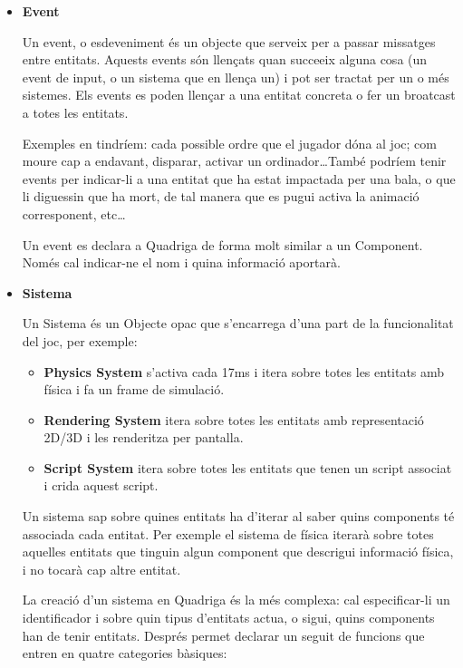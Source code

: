 \begin{itemize}
    \item{\bf Event}

      Un event, o esdeveniment és un objecte que serveix per a passar missatges entre entitats. Aquests events són llençats quan succeeix alguna cosa (un event de input, o un sistema que en llença un) i pot ser tractat per un o més sistemes. Els events es poden llençar a una entitat concreta o fer un broatcast a totes les entitats.
      
      Exemples en tindríem: cada possible ordre que el jugador dóna al joc; com moure cap a endavant, disparar, activar un ordinador\ldots També podríem tenir events per indicar-li a una entitat que ha estat impactada per una bala, o que li diguessin que ha mort, de tal manera que es pugui activa la animació corresponent, etc\ldots

      Un event es declara a Quadriga de forma molt similar a un Component. Només cal indicar-ne el nom i quina informació aportarà.

    \item{\bf Sistema}

      Un Sistema és un Objecte opac que s'encarrega d'una part de la funcionalitat del joc, per exemple:
      \begin{itemize}
        \item{\bf Physics System} s'activa cada 17ms i itera sobre totes les entitats amb física i fa un frame de simulació.
        \item{\bf Rendering System} itera sobre totes les entitats amb representació 2D/3D i les renderitza per pantalla.
        \item{\bf Script System} itera sobre totes les entitats que tenen un script associat i crida aquest script.
      \end{itemize}

      Un sistema sap sobre quines entitats ha d'iterar al saber quins components té associada cada entitat. Per exemple el sistema de física iterarà sobre totes aquelles entitats que tinguin algun component que descrigui informació física, i no tocarà cap altre entitat.

      La creació d'un sistema en Quadriga és la més complexa: cal especificar-li un identificador i sobre quin tipus d'entitats actua, o sigui, quins components han de tenir entitats. Després permet declarar un seguit de funcions que entren en quatre categories bàsiques:
      

\end{itemize}
